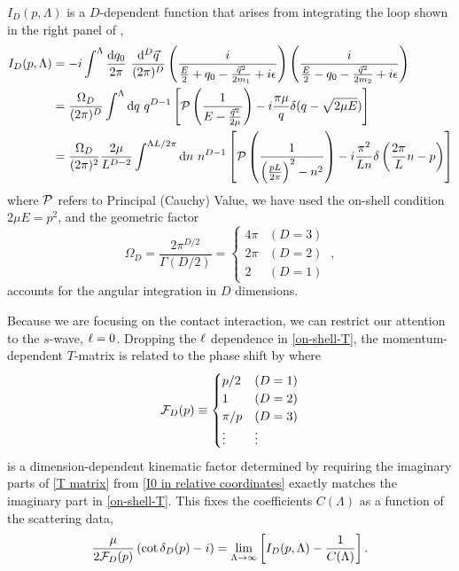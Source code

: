 $I_D(p,\Lambda)$ is a $D$-dependent function that arises from integrating the loop shown in the right panel of ,
\begin{align}
    I_D(p, \Lambda)
    &=-i\int^{\Lambda}
        \frac { \mathrm {d}q_0}{2\pi}\ \frac{\mathrm { d } ^ { D } \vec{ q } } { (2\pi)^ { D } }
        \left( \frac { i } { \frac{E}{2} + q _ { 0 } - \frac{\vec{q}^2}{2m_1} + i \epsilon } \right)
        \left( \frac { i } { \frac{E}{2} - q _ { 0 } - \frac{\vec{q}^2}{2m_2} + i \epsilon } \right)
    \label{eq:I0 in two particle language}\\
    &=\frac{\Omega_D}{(2\pi)^D}\int^{\Lambda}  \mathrm { d } q \ q^{D-1}\left[\PV \left( \frac { 1 } { E - \frac{\vec{q}^2}{2\mu} } \right)
-i\frac{\pi \mu}{q}\delta(q-\sqrt{2 \mu E})\right]
    \label{eq:I0 in relative coordinates}
    \\
    &=\frac{\Omega_D}{(2\pi)^2}\frac{2\mu}{L^{D-2}}\int^{\Lambda L/2\pi}  \mathrm { d } n \ n^{D-1}\left[\PV \left( \frac { 1 } { \left(\frac{pL}{2\pi}\right)^2 - n^2 } \right)
-i\frac{\pi^2}{L n}\delta\left(\frac{2\pi}{L}n -p\right)\right]
    \label{eq:I0}
\end{align}
where $\mathcal{P}$ refers to Principal (Cauchy) Value, we have used the on-shell condition $2\mu E=p^2$, and the geometric factor
\begin{equation}
\Omega_D=\frac{2\pi^{D/2}}{\Gamma(D/2)}=
    \begin{cases}
        4\pi    &   (D=3)\\
        2\pi    &   (D=2)\\
        2       &   (D=1)
    \end{cases}\ ,
\end{equation}
accounts for the angular integration in $D$ dimensions.

Because we are focusing on the contact interaction, we can restrict our attention to the $s$-wave, $\ell=0$.
Dropping the $\ell$ dependence in \eqref{on-shell-T}, the momentum-dependent $T$-matrix is related to the phase shift by where
\begin{equation}\label{eq:spherical FD}
    \mathcal{F}_{D}(p)
    \equiv
    \begin{cases}
        p/2     & (D=1)\\
        1       & (D=2)\\
        \pi/p   & (D=3)\\
        \vdots  & \vdots
\end{cases}
\end{equation}
is a dimension-dependent kinematic factor determined by requiring the imaginary parts of \eqref{T matrix} from \eqref{I0 in relative coordinates} exactly matches the imaginary part in \eqref{on-shell-T}.
This fixes the coefficients $C(\Lambda)$ as a function of the scattering data,
\begin{equation}\label{eq:IV pole}
    \frac{\mu}{2 \mathcal{F}_{D}(p)}\left(\cot \delta_{D}(p) - i\right)
    =
    \lim\limits_{\Lambda \to \infty} \left[ I_D(p, \Lambda) - \frac{1}{C(\Lambda)} \right].
\end{equation}

